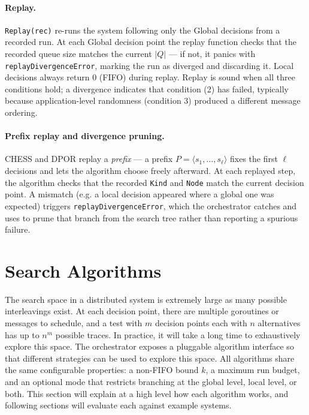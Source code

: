 \documentclass[11pt]{article}
\begin{document}
\paragraph{Replay.}
\texttt{Replay(rec)} re-runs the system following only the Global decisions from a recorded run. At each Global decision point the replay function checks that the recorded queue size matches the current $|Q|$ --- if not, it panics with \texttt{replayDivergenceError}, marking the run as diverged and discarding it. Local decisions always return 0 (FIFO) during replay. Replay is sound when all three conditions hold; a divergence indicates that condition (2) has failed, typically because application-level randomness (condition 3) produced a different message ordering.

\paragraph{Prefix replay and divergence pruning.}
CHESS and DPOR replay a \emph{prefix} --- a prefix $P = \langle s_1, \ldots, s_\ell \rangle$ fixes the first $\ell$ decisions and lets the algorithm choose freely afterward. At each replayed step, the algorithm checks that the recorded \texttt{Kind} and \texttt{Node} match the current decision point. A mismatch (e.g. a local decision appeared where a global one was expected) triggers \texttt{replayDivergenceError}, which the orchestrator catches and uses to prune that branch from the search tree rather than reporting a spurious failure.

\section{Search Algorithms}

The search space in a distributed system is extremely large as many possible interleavings exist. At each decision point, there are multiple goroutines or messages to schedule, and a test with $m$ decision points each with $n$ alternatives has up to $n^m$ possible traces. In practice, it will take a long time to exhaustively explore this space. The orchestrator exposes a pluggable algorithm interface so that different strategies can be used to explore this space. All algorithms share the same configurable properties: a non-FIFO bound $k$, a maximum run budget, and an optional mode that restricts branching at the global level, local level, or both. This section will explain at a high level how each algorithm works, and following sections will evaluate each against example systems. 
\end{document}
